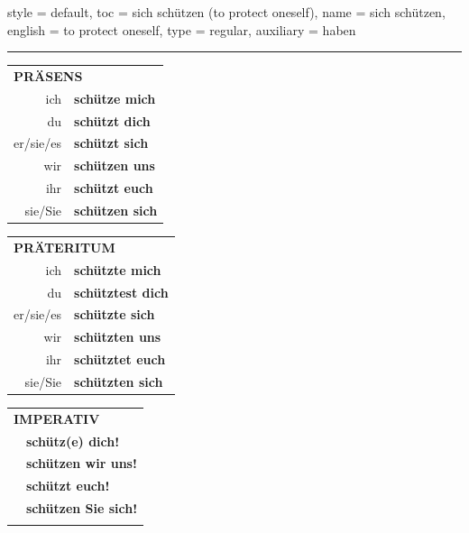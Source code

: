 \begin{verbentry}{
  style = {default},
  toc = {sich schützen (to protect oneself)},
  name = {sich schützen},
  english = {to protect oneself},
  type = {regular},
  auxiliary = {haben}
}
 
    
     \vspace{5pt}

    \hrule
    
    \vspace{5pt}

  \begin{tabular}{rl}
     \multicolumn{2}{l}{\textbf{PRÄSENS} }\\
    ich & \textbf{schütze mich}\\
    du & \textbf{schützt dich}\\
    er/sie/es & \textbf{schützt sich}\\
    wir & \textbf{schützen uns}\\
    ihr & \textbf{schützt euch}\\
    sie/Sie & \textbf{schützen sich}\\
  \end{tabular}
  \hfill
     \begin{tabular}{rl}
    \multicolumn{2}{l}{\textbf{PRÄTERITUM} }\\
    ich & \textbf{schützte mich}\\
    du & \textbf{schütztest dich}\\
    er/sie/es & \textbf{schützte sich}\\
    wir & \textbf{schützten uns}\\
    ihr & \textbf{schütztet euch}\\
    sie/Sie & \textbf{schützten sich}\\
  \end{tabular}
  \hfill
  \begin{tabular}{rl}
     \multicolumn{2}{l}{\textbf{IMPERATIV} }\\
   & \textbf{schütz(e) dich!}\\
   & \textbf{schützen wir uns!}\\
   & \textbf{schützt euch!}\\
   & \textbf{schützen Sie sich!}\\
   & \vspace{10pt}
  \end{tabular}

    \vspace{10pt}


\end{verbentry}
